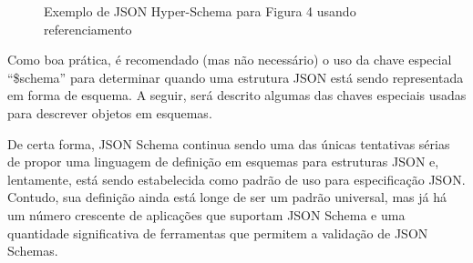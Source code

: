 \begin{figure}[H]
  \centering
  \inputminted[frame=single,framesep=10pt]{javascript}{anexos/pessoa-hyper-schema-ref.json}
  \caption{Exemplo de JSON Hyper-Schema para Figura 4 usando referenciamento}
\end{figure}

Como boa prática, é recomendado (mas não necessário) o uso da chave especial “\$schema” para determinar quando uma estrutura JSON está sendo representada em forma de esquema. A seguir, será descrito algumas das chaves especiais usadas para descrever objetos em esquemas. \cite{Droettboom2015}

\begin{table}[ht!]
  \centering
  \caption{Subconjunto de chaves especiais JSON Schema}
\end{table}

De certa forma, JSON Schema continua sendo uma das únicas tentativas sérias de propor uma linguagem de definição em esquemas para estruturas JSON e, lentamente, está sendo estabelecida como padrão de uso para especificação JSON. Contudo, sua definição ainda está longe de ser um padrão universal, mas já há um número crescente de aplicações que suportam JSON Schema e uma quantidade significativa de ferramentas que permitem a validação de JSON Schemas. \cite{PezoaEtAl2016}

